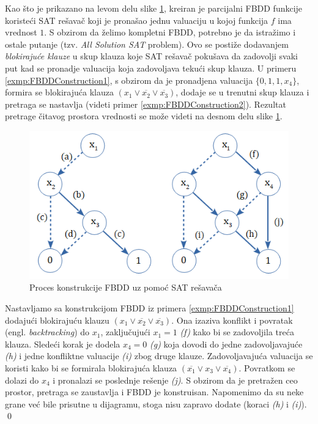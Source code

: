 Kao \v{s}to je prikazano na levom delu slike \ref{diag:FBDDConstruction}, kreiran je parcijalni FBDD funkcije koriste\'c{}i SAT re\v{s}ava\v{c} koji je prona\v{s}ao jednu valuaciju u kojoj funkcija $f$ ima vrednost $1$. S obzirom da \v{z}elimo kompletni FBDD, potrebno je da istra\v{z}imo i ostale putanje (tzv. \emph{All Solution SAT} problem). Ovo se posti\v{z}e dodavanjem \emph{blokiraju\'c{}e klauze} u skup klauza koje SAT re\v{s}ava\v{c} poku\v{s}ava da zadovolji svaki put kad se pronadje valuacija koja zadovoljava teku\'c{}i skup klauza. U primeru \ref{exmp:FBDDConstruction1}, s obzirom da je pronadjena valuacija $\{0, 1, 1, x_{4}\}$, formira se blokiraju\'c{}a klauza $(x_{1} \vee \overline{x_{2}} \vee \overline{x_{3}})$, dodaje se u trenutni skup klauza i pretraga se nastavlja (videti primer \ref{exmp:FBDDConstruction2}). Rezultat pretrage \v{c}itavog prostora vrednosti se mo\v{z}e videti na desnom delu slike \ref{diag:FBDDConstruction}.

\begin{figure}[H]
    \centering
    \includegraphics[scale=0.7]{slike/FBDD_Construction.PNG}
    \caption{Proces konstrukcije FBDD uz pomo\'c{} SAT re\v{s}ava\v{c}a}
    \label{diag:FBDDConstruction}
\end{figure}

\begin{exmp}
    Nastavljamo sa konstrukcijom FBDD iz primera \ref{exmp:FBDDConstruction1} dodaju\'c{}i blokiraju\'c{}u klauzu $(x_{1} \vee \overline{x_{2}} \vee \overline{x_{3}})$. Ona izaziva konflikt i povratak (engl. \emph{backtracking}) do $x_{1}$, zaklju\v{c}uju\'c{}i $x_{1} = 1$ \textit{(f)} kako bi se zadovoljila tre\'c{}a klauza. Slede\'c{}i korak je dodela $x_{4} = 0$ \textit{(g)} koja dovodi do jedne zadovoljavaju\'c{}e \textit{(h)} i jedne konfliktne valuacije \textit{(i)} zbog druge klauze. Zadovoljavaju\'c{}a valuacija se koristi kako bi se formirala blokiraju\'c{}a klauza $(\overline{x_{1}} \vee x_{3} \vee \overline{x_{4}})$. Povratkom se dolazi do $x_{4}$ i pronalazi se poslednje re\v{s}enje \textit{(j)}. S obzirom da je pretra\v{z}en ceo prostor, pretraga se zaustavlja i FBDD je konstruisan. Napomenimo da su neke grane ve\'c{} bile prisutne u dijagramu, stoga nisu zapravo dodate (koraci \textit{(h)} i \textit{(i)}).
    \label{exmp:FBDDConstruction2}
    \qed
\end{exmp}


